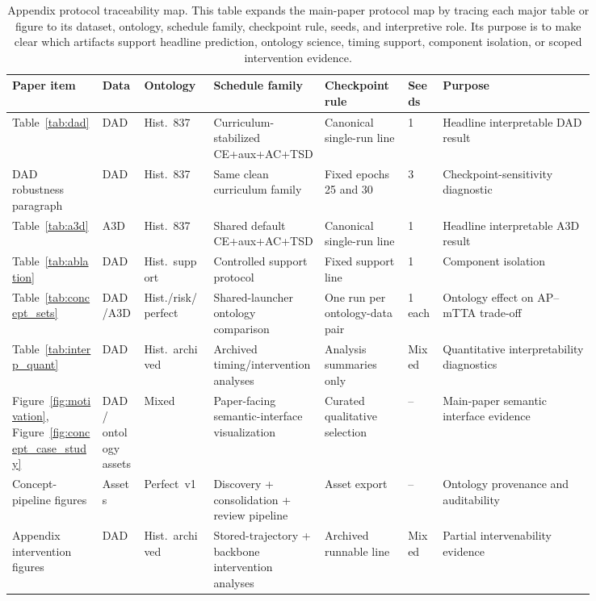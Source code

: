 \begin{table}[t]
\caption{Appendix protocol traceability map. This table expands the main-paper
protocol map by tracing each major table or figure to its dataset, ontology,
schedule family, checkpoint rule, seeds, and interpretive role. Its purpose is
to make clear which artifacts support headline prediction, ontology science,
timing support, component isolation, or scoped intervention evidence.}
\label{tab:appendix_protocol_trace}
\centering\scriptsize
\setlength{\tabcolsep}{2pt}
\begin{tabular}{p{0.13\linewidth}p{0.06\linewidth}p{0.10\linewidth}p{0.16\linewidth}p{0.12\linewidth}p{0.05\linewidth}p{0.22\linewidth}}
\toprule
Paper item & Data & Ontology & Schedule family & Checkpoint rule & Seeds & Purpose \\
\midrule
Table~\ref{tab:dad} & DAD & Hist.~837 & Curriculum-stabilized CE+aux+AC+TSD & Canonical single-run line & 1 & Headline interpretable DAD result \\
DAD robustness paragraph & DAD & Hist.~837 & Same clean curriculum family & Fixed epochs 25 and 30 & 3 & Checkpoint-sensitivity diagnostic \\
Table~\ref{tab:a3d} & A3D & Hist.~837 & Shared default CE+aux+AC+TSD & Canonical single-run line & 1 & Headline interpretable A3D result \\
Table~\ref{tab:ablation} & DAD & Hist.~support & Controlled support protocol & Fixed support line & 1 & Component isolation \\
Table~\ref{tab:concept_sets} & DAD/\allowbreak A3D & Hist./risk/\allowbreak perfect & Shared-launcher ontology comparison & One run per ontology-data pair & 1 each & Ontology effect on AP--mTTA trade-off \\
Table~\ref{tab:interp_quant} & DAD & Hist.~archived & Archived timing/intervention analyses & Analysis summaries only & Mixed & Quantitative interpretability diagnostics \\
Figure~\ref{fig:motivation}, Figure~\ref{fig:concept_case_study} & DAD / ontology assets & Mixed & Paper-facing semantic-interface visualization & Curated qualitative selection & -- & Main-paper semantic interface evidence \\
Concept-pipeline figures & Assets & Perfect~v1 & Discovery + consolidation + review pipeline & Asset export & -- & Ontology provenance and auditability \\
Appendix intervention figures & DAD & Hist.~archived & Stored-trajectory + backbone intervention analyses & Archived runnable line & Mixed & Partial intervenability evidence \\
\bottomrule
\end{tabular}
\end{table}

